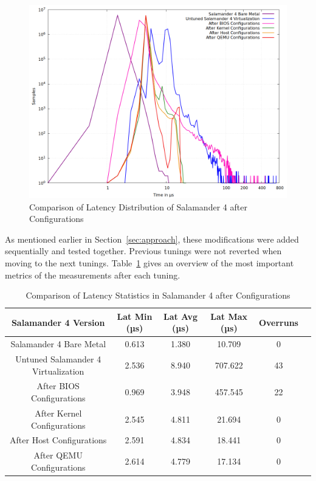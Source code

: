 \documentclass[MMR,Master,english]{style/twbook}
\begin{document}
\begin{figure}[H]
	\centering
	\includegraphics[width=0.70\columnwidth]{img/results/gnuplot_combined_max_latency_all.png}
	\caption[Comparison of Latency Distribution of Salamander 4 Configurations]{Comparison of Latency Distribution of Salamander 4 after Configurations}
	\label{fig:max_latency_combined_results}
\end{figure}

\noindent As mentioned earlier in Section~\ref{sec:approach}, these modifications were added sequentially and tested together. Previous tunings were not reverted when moving to the next tunings. Table~\ref{tab:latency_tables_combined} gives an overview of the most important metrics of the measurements after each tuning.

\begin{table}[H]
	\centering
	\footnotesize
	\caption{Comparison of Latency Statistics in Salamander 4 after Configurations}
	\label{tab:latency_tables_combined}
	\begin{tabular}{|c|c|c|c|c|c|}
		\hline
		\textbf{Salamander 4 Version}      & \textbf{Lat Min (µs)} & \textbf{Lat Avg (µs)} & \textbf{Lat Max (µs)} & \textbf{Overruns} \\ \hline
		Salamander 4 Bare Metal      & 0.613                 & 1.380                 & 10.709                & 0                 \\ \hline
		Untuned Salamander 4 Virtualization & 2.536                 & 8.940                 & 707.622               & 43                \\ \hline
		After BIOS Configurations     & 0.969                 & 3.948                 & 457.545               & 22                \\ \hline
		After Kernel Configurations   & 2.545                 & 4.811                 & 21.694                & 0                 \\ \hline
		After Host Configurations     & 2.591                 & 4.834                 & 18.441                & 0                 \\ \hline
		After QEMU Configurations     & 2.614                 & 4.779                 & 17.134                & 0                 \\ \hline
	\end{tabular}
\end{table}
\end{document}
